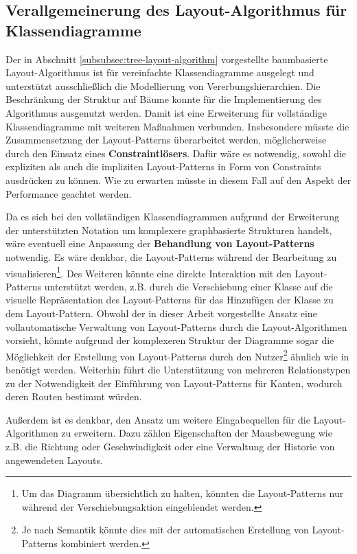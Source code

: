 \subsection{Verallgemeinerung des Layout-Algorithmus für Klassendiagramme}

Der in Abschnitt \ref{subsubsec:tree-layout-algorithm} vorgestellte baumbasierte Layout-Algorithmus ist für vereinfachte Klassendiagramme ausgelegt und unterstützt ausschließlich die Modellierung von Vererbungshierarchien. Die Beschränkung der Struktur auf Bäume konnte für die Implementierung des Algorithmus ausgenutzt werden. Damit ist eine Erweiterung für vollständige Klassendiagramme mit weiteren Maßnahmen verbunden. Insbesondere müsste die Zusammensetzung der Layout-Patterns überarbeitet werden, möglicherweise durch den Einsatz eines \textbf{Constraintlösers}. Dafür wäre es notwendig, sowohl die expliziten als auch die impliziten Layout-Patterns in Form von Constraints ausdrücken zu können. Wie zu erwarten müsste in diesem Fall auf den Aspekt der Performance geachtet werden.

Da es sich bei den vollständigen Klassendiagrammen aufgrund der Erweiterung der unterstützten Notation um komplexere graphbasierte Strukturen handelt, wäre eventuell eine Anpassung der \textbf{Behandlung von Layout-Patterns} notwendig. Es wäre denkbar, die Layout-Patterns während der Bearbeitung zu visualisieren\footnote{Um das Diagramm übersichtlich zu halten, könnten die Layout-Patterns nur während der Verschiebungsaktion eingeblendet werden.}. Des Weiteren könnte eine direkte Interaktion mit den Layout-Patterns unterstützt werden, z.B. durch die Verschiebung einer Klasse auf die visuelle Repräsentation des Layout-Patterns für das Hinzufügen der Klasse zu dem Layout-Pattern. Obwohl der in dieser Arbeit vorgestellte Ansatz eine vollautomatische Verwaltung von Layout-Patterns durch die Layout-Algorithmen vorsieht, könnte aufgrund der komplexeren Struktur der Diagramme sogar die Möglichkeit der Erstellung von Layout-Patterns durch den Nutzer\footnote{Je nach Semantik könnte dies mit der automatischen Erstellung von Layout-Patterns kombiniert werden.} ähnlich wie in \cite{Maier12A-Pattern-based} benötigt werden. Weiterhin führt die Unterstützung von mehreren Relationstypen zu der Notwendigkeit der Einführung von Layout-Patterns für Kanten, wodurch deren Routen bestimmt würden.

Außerdem ist es denkbar, den Ansatz um weitere Eingabequellen für die Layout-Algorithmen zu erweitern. Dazu zählen Eigenschaften der Mausbewegung wie z.B. die Richtung oder Geschwindigkeit oder eine Verwaltung der Historie von angewendeten Layouts.
